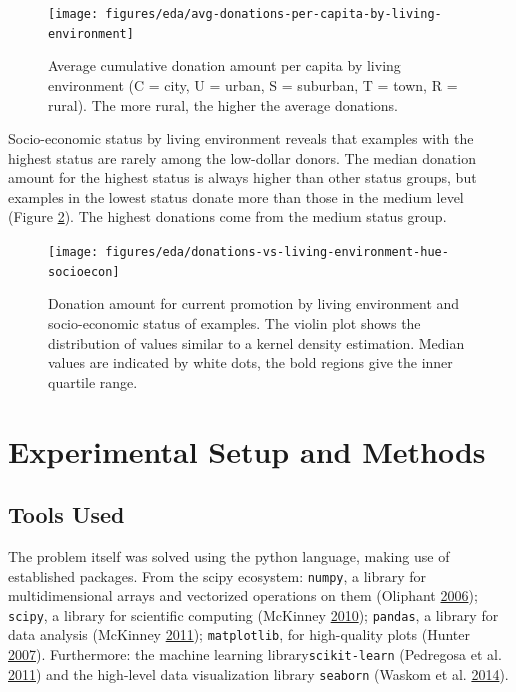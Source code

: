 \documentclass[
  11pt,
  a4paper,
  DIV=12,captions=tableheading,oneside,titlepage]{scrbook}
\begin{document}
\begin{figure}

{\centering \texttt{[image: figures/eda/avg-donations-per-capita-by-living-environment]} 

}

\caption{Average cumulative donation amount per capita by living environment (C = city, U = urban, S = suburban, T = town, R = rural). The more rural, the higher the average donations.}\label{fig:donations-le}
\end{figure}

Socio-economic status by living environment reveals that examples with the highest status are rarely among the low-dollar donors. The median donation amount for the highest status is always higher than other status groups, but examples in the lowest status donate more than those in the medium level (Figure \ref{fig:donations-le-socioec}). The highest donations come from the medium status group.



\begin{figure}

{\centering \texttt{[image: figures/eda/donations-vs-living-environment-hue-socioecon]} 

}

\caption{Donation amount for current promotion by living environment and socio-economic status of examples. The violin plot shows the distribution of values similar to a kernel density estimation. Median values are indicated by white dots, the bold regions give the inner quartile range.}\label{fig:donations-le-socioec}
\end{figure}

\hypertarget{experimental-setup-and-methods}{%
\chapter{Experimental Setup and Methods}\label{experimental-setup-and-methods}}

\hypertarget{tools-used}{%
\section{Tools Used}\label{tools-used}}

The problem itself was solved using the python language, making use of established packages. From the scipy ecosystem: \texttt{numpy}, a library for multidimensional arrays and vectorized operations on them (Oliphant \protect\hyperlink{ref-oliphant2006guide}{2006}); \texttt{scipy}, a library for scientific computing (McKinney \protect\hyperlink{ref-mckinney-proc-scipy-2010}{2010}); \texttt{pandas}, a library for data analysis (McKinney \protect\hyperlink{ref-mckinney2011pandas}{2011}); \texttt{matplotlib}, for high-quality plots (Hunter \protect\hyperlink{ref-hunter2007matplotlib}{2007}). Furthermore: the machine learning library\texttt{scikit-learn} (Pedregosa et al. \protect\hyperlink{ref-scikit-learn}{2011}) and the high-level data visualization library \texttt{seaborn} (Waskom et al. \protect\hyperlink{ref-waskom2014seaborn}{2014}).
\end{document}
